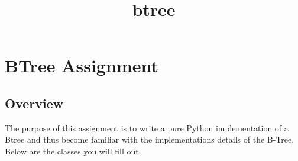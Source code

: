 \documentclass[11pt]{article}
\title{btree}
\begin{document}
    
    
    \maketitle
    
    

    
    \section{BTree Assignment}\label{btree-assignment}

\subsection{Overview}\label{overview}

The purpose of this assignment is to write a pure Python implementation
of a Btree and thus become familiar with the implementations details of
the B-Tree. Below are the classes you will fill out.
\end{document}
